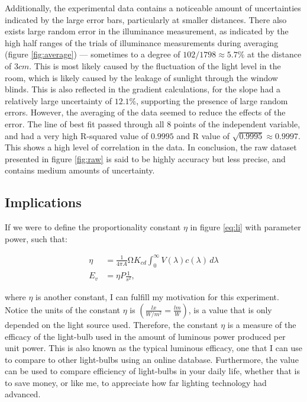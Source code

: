 \documentclass[a4paper,12pt]{article}
\begin{document}
Additionally, the experimental data contains a noticeable amount of uncertainties indicated by the large error bars, particularly at smaller distances. There also exists large random error in the illuminance measurement, as indicated by the high half ranges of the trials of illuminance measurements during averaging (figure \ref{fig:average}) --- sometimes to a degree of $102/1798 \approx 5.7\%$ at the distance of $3\si{cm}$. This is most likely caused by the fluctuation of the light level in the room, which is likely caused by the leakage of sunlight through the window blinds. This is also reflected in the gradient calculations, for the slope had a relatively large uncertainty of $12.1\%$, supporting the presence of large random errors. However, the averaging of the data seemed to reduce the effects of the error. The line of best fit passed through all 8 points of the independent variable, and had a very high R-squared value of $0.9995$ and R value of $\sqrt{0.9995} \approx 0.9997$. This shows a high level of correlation in the data. In conclusion, the raw dataset presented in figure \ref{fig:raw} is said to be highly accuracy but less precise, and contains medium amounts of uncertainty.

\subsection{Implications}

If we were to define the proportionality constant $\eta$ in figure \ref{eq:li} with parameter power, such that:

\begin{align*}
    \eta &= \frac{1}{4\pi A} \si{\ohm} K_{cd} \int_{0}^{\infty} V(\lambda) c(\lambda) \, d\lambda\\
    E_v &= \eta P \frac{1}{s^2},
\end{align*}

where $\eta$ is another constant, I can fulfill my motivation for this experiment. Notice the units of the constant $\eta$ is $(\frac{\si{lx}}{\si{W\per m^2}} = \frac{\si{lm}}{\si{W}})$, is a value that is only depended on the light source used. Therefore, the constant $\eta$ is a measure of the efficacy of the light-bulb used in the amount of luminous power produced per unit power. This is also known as the typical luminous efficacy, one that I can use to compare to other light-bulbs using an online database. Furthermore, the value can be used to compare efficiency of light-bulbs in your daily life, whether that is to save money, or like me, to appreciate how far lighting technology had advanced.
\end{document}

